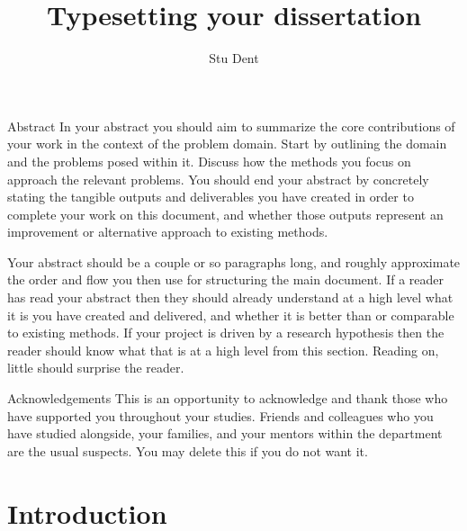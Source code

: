 \documentclass[12pt]{article}
\title{Typesetting your dissertation}
\author{Stu Dent}
\theoremstyle{plain}
\theoremstyle{definition}
\begin{document}
\maketitle
\studentdeclarations

\begin{frontmatterparagraph}{Abstract}
  In your abstract you should aim to summarize the core contributions
  of your work in the context of the problem domain. Start by
  outlining the domain and the problems posed within it. Discuss how
  the methods you focus on approach the relevant problems. You should
  end your abstract by concretely stating the tangible outputs and
  deliverables you have created in order to complete your work on this
  document, and whether those outputs represent an improvement or
  alternative approach to existing methods.

  Your abstract should be a couple or so paragraphs long, and roughly
  approximate the order and flow you then use for structuring the main
  document. If a reader has read your abstract then they should
  already understand at a high level what it is you have created and
  delivered, and whether it is better than or comparable to existing
  methods. If your project is driven by a research hypothesis then the
  reader should know what that is at a high level from this
  section. Reading on, little should surprise the reader.
\end{frontmatterparagraph}

\begin{frontmatterparagraph}{Acknowledgements}
  This is an opportunity to acknowledge and thank those who have
  supported you throughout your studies. Friends and colleagues who
  you have studied alongside, your families, and your mentors within
  the department are the usual suspects. You may delete this if you
  do not want it.
\end{frontmatterparagraph}

\tableofcontents

\listoffigures
\listoftables
\clearpage


\section{Introduction}
\label{sec:intro}
\end{document}
